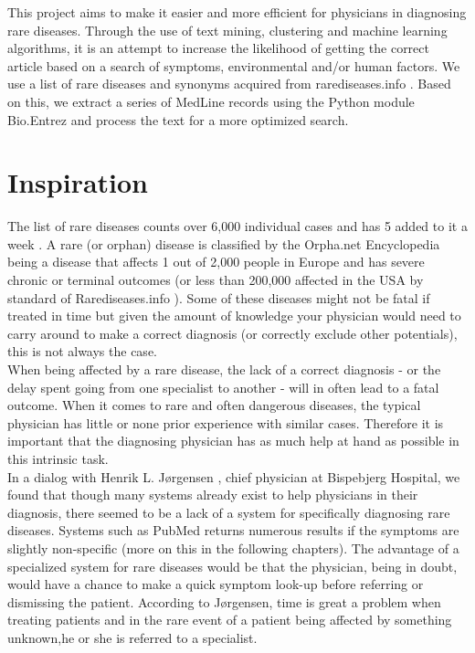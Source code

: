 This project aims to make it easier and more efficient for physicians
in diagnosing rare diseases. Through the use of text mining,
clustering and machine learning algorithms, it is an attempt to
increase the likelihood of getting the correct article based on a
search of symptoms, environmental and/or human factors. We use a list
of rare diseases and synonyms acquired from rarediseases.info
\cite{Rarediseases}. Based on this, we
extract a series of MedLine records \cite{PubMedFactSheetMedline}
using the Python module Bio.Entrez \cite{EntrezProgUtil} and process
the text for a more optimized search.

\section{Inspiration}

The list of rare diseases counts over 6,000 individual cases and has 5
added to it a week \cite{AboutRareDiseasesOrphanet}. A rare (or
orphan) disease is classified by the Orpha.net Encyclopedia
\cite{OrphanetEncyclopedia} being a disease that affects 1 out of 2,000
people in Europe and has severe chronic or terminal outcomes (or less
than 200,000 affected in the USA by standard of
Rarediseases.info \cite{Rarediseases}). Some
of these diseases might not be fatal if treated in time but given the
amount of knowledge your physician would need to carry around to make
a correct diagnosis (or correctly exclude other potentials), this is
not always the case.\\

When being affected by a rare disease, the lack of a correct diagnosis
- or the delay spent going from one specialist to another - will in
often lead to a fatal outcome. When it comes to rare and often
dangerous diseases, the typical physician has little or none prior
experience with similar cases. Therefore it is important that the
diagnosing physician has as much help at hand as possible in this
intrinsic task.\\

In a dialog with Henrik L. J\o rgensen \cite{TheDude}, chief physician
at Bispebjerg Hospital, we found that though many systems already exist
to help physicians in their diagnosis, there seemed to be a lack of a
system for specifically diagnosing rare diseases. Systems such as
PubMed returns numerous results if the symptoms are slightly
non-specific (more on this in the following chapters). The advantage
of a specialized system for rare diseases would be that the physician,
being in doubt, would have a chance to make a quick symptom look-up
before referring or dismissing the patient. According to Jørgensen,
time is great a problem when treating patients and in the rare event
of a patient being affected by something unknown,he or she is referred
to a specialist.\\

